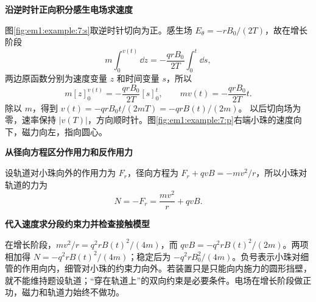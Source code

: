 \begin{solution}\textbf{沿逆时针正向积分感生电场求速度}\par\nobreak
图\ref{fig:em1:example:7:s}取逆时针切向为正。感生场 $E_\theta=-rB_0/(2T)$，故在增长阶段
\[
m\int_0^{v(t)}\dd z=-\frac{qrB_0}{2T}\int_0^t\dd s,
\]
两边原函数分别为速度变量 $z$ 和时间变量 $s$，所以
\[
 m[z]_0^{v(t)}=-\frac{qrB_0}{2T}[s]_0^t,
 \qquad mv(t)=-\frac{qrB_0}{2T}t.
\]
除以 $m$，得到 $v(t)=-qrB_0t/(2mT)=-qrB(t)/(2m)$。
以后切向场为零，速率保持 $|v(T)|$，方向顺时针。图\ref{fig:em1:example:7:p}右端小珠的速度向下，磁力向左，指向圆心。



\par\medskip{}\noindent\textbf{从径向方程区分作用力和反作用力}\par\nobreak
设轨道对小珠向外的作用力为 $F_r$，径向方程为 $F_r+qvB=-mv^2/r$，所以小珠对轨道的力为
\[N=-F_r=\frac{mv^2}{r}+qvB.
\]


\par\medskip{}\noindent\textbf{代入速度求分段约束力并检查接触模型}\par\nobreak
在增长阶段，$mv^2/r=q^2rB(t)^2/(4m)$，而 $qvB=-q^2rB(t)^2/(2m)$。两项相加得 $N=-q^2rB(t)^2/(4m)$；稳定后为 $-q^2rB_0^2/(4m)$。负号表示小珠对细管的作用向内，细管对小珠的约束力向外。若装置只是只能向内施力的圆形挡壁，就不能维持题设轨道；“穿在轨道上”的双向约束是必要条件。电场在增长阶段做正功，磁力和轨道力始终不做功。\end{solution}
